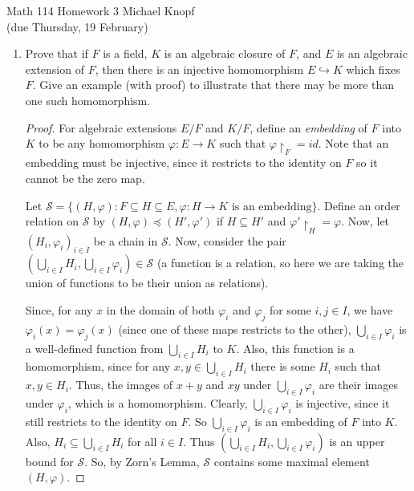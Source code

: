 \documentclass[10pt]{article}
\begin{document}
\begin{center}
\large Math 114 Homework 3
\normalsize Michael Knopf \\ (due Thursday, 19 February)

\end{center}

\begin{enumerate}

\item Prove that if $F$ is a field, $K$ is an algebraic closure of $F$, and $E$ is an algebraic extension of $F$, then there is an injective homomorphism $E \hookrightarrow K$ which fixes $F$.  Give an example (with proof) to illustrate that there may be more than one such homomorphism.

\begin{proof}

For algebraic extensions $E/F$ and $K/F$, define an \emph{embedding} of $F$ into $K$ to be any homomorphism $\varphi :E \rightarrow K$ such that $\varphi\restriction_F = id$.  Note that an embedding must be injective, since it restricts to the identity on $F$ so it cannot be the zero map.

Let $\mathcal{S} = \{ (H,\varphi) : F \subseteq H \subseteq E, \varphi: H \rightarrow K \text{ is an embedding} \}$.  Define an order relation on $\mathcal{S}$ by $(H, \varphi) \preceq (H', \varphi ')$ if $H \subseteq H'$ and $\varphi'\restriction_H = \varphi$.  Now, let $(H_i, \varphi_i)_{i \in I}$ be a chain in $\mathcal{S}$.  Now, consider the pair $\left(\bigcup_{i \in I} H_i, \bigcup_{i \in I} \varphi_i \right) \in \mathcal{S}$ (a function is a relation, so here we are taking the union of functions to be their union as relations).

Since, for any $x$ in the domain of both $\varphi_i$ and $\varphi_j$ for some $i,j \in I$, we have $\varphi_i(x) = \varphi_j(x)$ (since one of these maps restricts to the other), $\bigcup_{i \in I} \varphi_i$ is a well-defined function from $\bigcup_{i \in I} H_i$ to $K$.  Also, this function is a homomorphism, since for any $x,y \in \bigcup_{i \in I} H_i$ there is some $H_i$ such that $x,y \in H_i$.  Thus, the images of $x+y$ and $xy$ under $\bigcup_{i \in I} \varphi_i$ are their images under $\varphi_i$, which is a homomorphism.  Clearly, $\bigcup_{i \in I} \varphi_i$ is injective, since it still restricts to the identity on $F$.  So $\bigcup_{i \in I} \varphi_i$ is an embedding of $F$ into $K$.  Also, $H_i \subseteq \bigcup_{i \in I} H_i$ for all $i \in I$.  Thus $(\bigcup_{i \in I} H_i, \bigcup_{i \in I} \varphi_i)$ is an upper bound for $\mathcal{S}$.  So, by Zorn's Lemma, $\mathcal{S}$ contains some maximal element $(H, \varphi)$.


\end{proof}
\end{enumerate}
\end{document}

